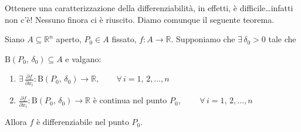 Ottenere una caratterizzazione della differenziabilità, in effetti, è difficile\ldots infatti non c'è! Nessuno finora ci è riuscito. Diamo comunque il seguente teorema.

\begin{thm}
Siano $A \subseteq \mathbb{R}^n$ aperto, $P_0 \in A$ fissato, $f:A \longrightarrow \mathbb{R}$. Supponiamo che $\exists \, \delta_0 > 0$ tale che 
\begin{center}
\def\svgwidth{6cm}

\end{center}
$\mathrm{B}(P_0,\,\delta_0) \subseteq A$ e valgano:
\begin{enumerate}[labelindent=\parindent,leftmargin=*,label=\textnormal{(\roman*)},start=1]
\item $\displaystyle \exists \, \frac{\partial f}{\partial x_i} : \mathrm{B}(P_0,\,\delta_0) \longrightarrow \mathbb{R}, \qquad \forall \, i = 1,\,2,\ldots,n$
\item $\displaystyle \frac{\partial f}{\partial x_i} : \mathrm{B}(P_0,\,\delta_0) \longrightarrow \mathbb{R}$ è continua nel punto $P_0$, $\qquad \forall \, i = 1,\,2,\ldots,n$
\end{enumerate}
Allora $f$ è differenziabile nel punto $P_0$.
\end{thm}

